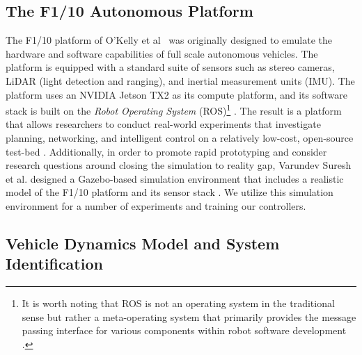 \documentclass[manuscript,screen,review]{acmart}
\newcommand{\todo}[1]{\textcolor{red}{\textbf{\underline{TODO:}} #1}}
\begin{document}

\subsection{The F1/10 Autonomous Platform}

The F1/10 platform of O'Kelly et al~\cite{F1102019} was originally designed to emulate the hardware and software capabilities of full scale autonomous vehicles. The platform is equipped with a standard suite of sensors such as stereo cameras, LiDAR (light detection and ranging), and inertial measurement units (IMU). The platform uses an NVIDIA Jetson TX2 as its compute platform, and its software stack is built on the \emph{Robot Operating System} (ROS)\footnote{It is worth noting that ROS is not an operating system in the traditional sense but rather a meta-operating system that primarily provides the message passing interface for various components within robot software development \cite{Huang2014}.} \cite{ROS}. The result is a platform that allows researchers to conduct real-world experiments that investigate planning, networking, and intelligent control on a relatively low-cost, open-source test-bed \cite{F1102019}. Additionally, in order to promote rapid prototyping and consider research questions around closing the simulation to reality gap\cite{Muratore2019}, Varundev Suresh et al. designed a Gazebo-based simulation environment \cite{Gazebo} that includes a realistic model of the F1/10 platform and its sensor stack \cite{varundev_ros_19}. We utilize this simulation environment for a number of experiments and training our controllers.


\subsection{Vehicle Dynamics Model and System Identification}
\end{document}
